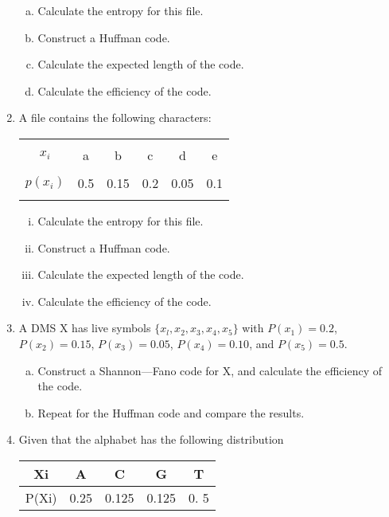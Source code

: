 \documentclass[a4paper,12pt]{article}
\begin{document}
\begin{enumerate}
\begin{enumerate}[(a)]
    \item Calculate the entropy for this file. 
    \item Construct a Huffman code. 
    \item Calculate the expected length of the code. 
    \item Calculate the efficiency of the code.
\end{enumerate}

\item A file contains the following characters:
\begin{center}
	\begin{tabular}{|c|ccccc|}
		\hline
		&&&&& \\[-0.4cm]
		$x_i$     & a & b & c & d & e \\[0.1cm]
		\hline
		&&&&& \\[-0.4cm]
		$p(x_i)$  & 0.5 & 0.15 & 0.2 & 0.05 & 0.1 \\[0.1cm]
		\hline
		\multicolumn{6}{c}{}\\[-0.2cm]
	\end{tabular}
\end{center}
\begin{enumerate}[(i)]
    \item Calculate the entropy for this file. 
    \item Construct a Huffman code. 
    \item Calculate the expected length of the code. 
    \item  Calculate the efficiency of the code.
\end{enumerate}




\item 
A DMS X has live symbols $\{x_l,x_2,x_3,x_4,x_5\}$ with $P(x_1) = 0.2$, $P(x_2)=0.15$, $P(x_3) =0.05$,
$P(x_4) = 0.10$, and $P(x_5) = 0.5$. 
\begin{enumerate}[(a)]
\item Construct a Shannon—Fano code for X, and calculate the efficiency of the code.
\item Repeat for the Huffman code and compare the results.
\end{enumerate}

\item Given that the alphabet has the following distribution 
\begin{center}
    \begin{tabular}{|c|c|c|c|c|}
\hline
Xi & A & C & G & T \\ \hline
P(Xi) & 0.25 & 0.125 & 0.125 & 0. 5 \\
\hline
\end{tabular} 
\end{center}



\end{enumerate}
\end{document}
